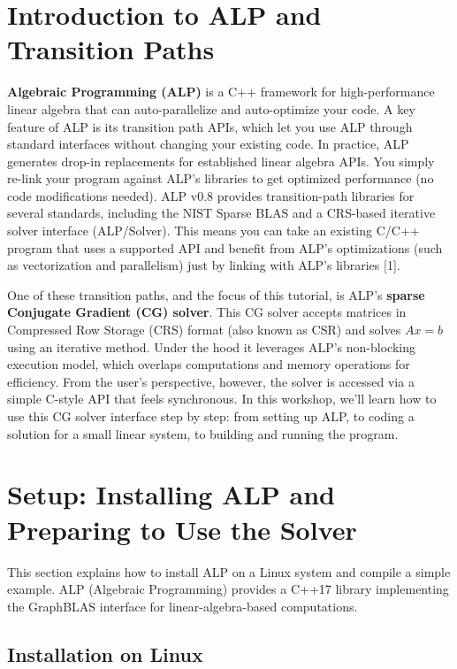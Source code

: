 
\section*{Introduction to ALP and Transition Paths}

\textbf{Algebraic Programming (ALP)} is a C++ framework for high-performance linear algebra that can auto-parallelize and auto-optimize your code. A key feature of ALP is its transition path APIs, which let you use ALP through standard interfaces without changing your existing code. In practice, ALP generates drop-in replacements for established linear algebra APIs. You simply re-link your program against ALP’s libraries to get optimized performance (no code modifications needed). ALP v0.8 provides transition-path libraries for several standards, including the NIST Sparse BLAS and a CRS-based iterative solver interface (ALP/Solver). This means you can take an existing C/C++ program that uses a supported API and benefit from ALP’s optimizations (such as vectorization and parallelism) just by linking with ALP’s libraries [1].

One of these transition paths, and the focus of this tutorial, is ALP’s \textbf{sparse Conjugate Gradient (CG) solver}. This CG solver accepts matrices in Compressed Row Storage (CRS) format (also known as CSR) and solves $Ax=b$ using an iterative method. Under the hood it leverages ALP’s non-blocking execution model, which overlaps computations and memory operations for efficiency. From the user’s perspective, however, the solver is accessed via a simple C-style API that feels synchronous. In this workshop, we’ll learn how to use this CG solver interface step by step: from setting up ALP, to coding a solution for a small linear system, to building and running the program.


\section*{Setup: Installing ALP and Preparing to Use the Solver}
This section explains how to install ALP on a Linux system and compile a simple example. ALP (Algebraic Programming) provides a C++17 library implementing the GraphBLAS interface for linear-algebra-based computations.

\subsection*{Installation on Linux}

